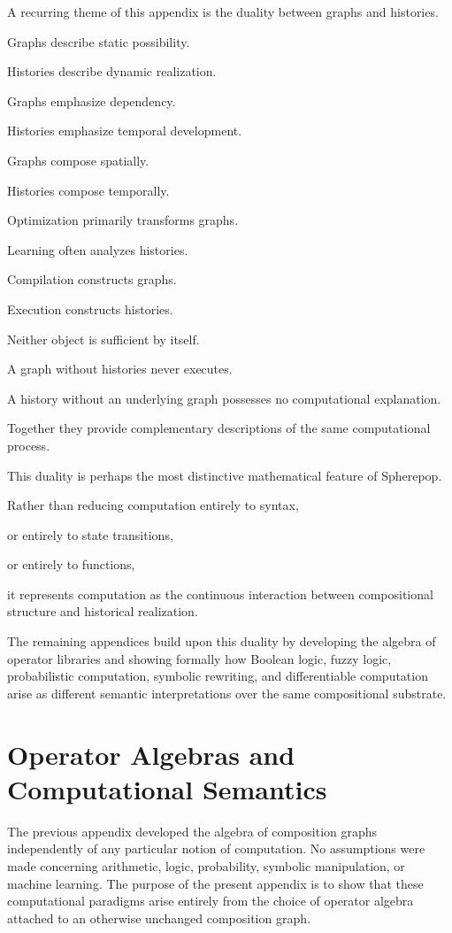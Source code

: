 \documentclass[12pt,oneside]{article}
\begin{document}
A recurring theme of this appendix is the duality between graphs and histories.

Graphs describe static possibility.

Histories describe dynamic realization.

Graphs emphasize dependency.

Histories emphasize temporal development.

Graphs compose spatially.

Histories compose temporally.

Optimization primarily transforms graphs.

Learning often analyzes histories.

Compilation constructs graphs.

Execution constructs histories.

Neither object is sufficient by itself.

A graph without histories never executes.

A history without an underlying graph possesses no computational explanation.

Together they provide complementary descriptions of the same computational process.

This duality is perhaps the most distinctive mathematical feature of Spherepop.

Rather than reducing computation entirely to syntax,

or entirely to state transitions,

or entirely to functions,

it represents computation as the continuous interaction between compositional structure and historical realization.

The remaining appendices build upon this duality by developing the algebra of operator libraries and showing formally how Boolean logic, fuzzy logic, probabilistic computation, symbolic rewriting, and differentiable computation arise as different semantic interpretations over the same compositional substrate.

\section{Operator Algebras and Computational Semantics}

The previous appendix developed the algebra of composition graphs independently of any particular notion of computation. No assumptions were made concerning arithmetic, logic, probability, symbolic manipulation, or machine learning. The purpose of the present appendix is to show that these computational paradigms arise entirely from the choice of operator algebra attached to an otherwise unchanged composition graph.
\end{document}
